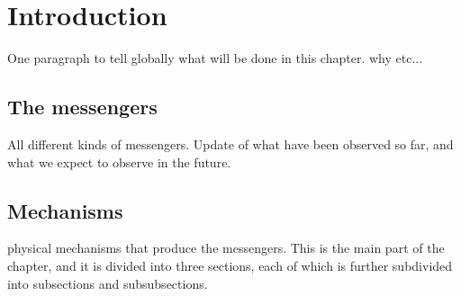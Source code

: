 

\chapter{Introduction}

One paragraph to tell globally what will be done in this chapter. why etc...

\newcommand*{\Jpsi}{\ifpdftex\mathord{\bm{J}/\bm{\psi}}\else\mathord{\symbfit{J/\psi}}\fi} %

\section[The messengers]{The messengers}

All different kinds of messengers. Update of what have been observed so far, and what we expect to observe in the future.



\section[Mechanisms]{Mechanisms}

physical mechanisms that produce the messengers. This is the main part of the chapter, and it is divided into three sections, each of which is further subdivided into subsections and subsubsections.

